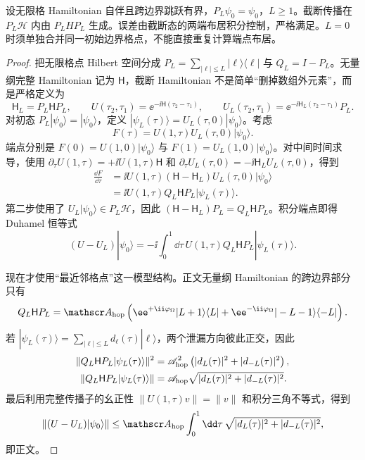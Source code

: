 \begin{proposition}
设无限格 Hamiltonian 自伴且跨边界跳跃有界，$P_L\psi_0=\psi_0$，$L\ge1$。截断传播在 $P_L\mathcal H$ 内由 $P_LHP_L$ 生成。误差由截断态的两端布居积分控制，严格满足。$L=0$ 时须单独合并同一初始边界格点，不能直接重复计算端点布居。
\end{proposition}
\begin{proof}
把无限格点 Hilbert 空间分成
$P_L=\sum_{|\ell|\le L}|\ell\rangle\langle\ell|$ 与 $Q_L=I-P_L$。无量纲完整 Hamiltonian 记为 $\mathsf H$，截断 Hamiltonian 不是简单“删掉数组外元素”，而是严格定义为
\begin{equation*}
 \mathsf H_L=P_L\mathsf H P_L,
 \qquad
 U(\tau_2,\tau_1)=\ee^{-\ii\mathsf H(\tau_2-\tau_1)},
 \qquad
 U_L(\tau_2,\tau_1)=\ee^{-\ii\mathsf H_L(\tau_2-\tau_1)}P_L.
\end{equation*}
对初态 $P_L|\psi_0\rangle=|\psi_0\rangle$，定义
$|\psi_L(\tau)\rangle=U_L(\tau,0)|\psi_0\rangle$。考虑
\begin{equation*}
 F(\tau)=U(1,\tau)U_L(\tau,0)|\psi_0\rangle .
\end{equation*}
端点分别是 $F(0)=U(1,0)|\psi_0\rangle$ 与
$F(1)=U_L(1,0)|\psi_0\rangle$。对中间时间求导，使用
$\partial_\tau U(1,\tau)=+\ii U(1,\tau)\mathsf H$ 和
$\partial_\tau U_L(\tau,0)=-\ii\mathsf H_LU_L(\tau,0)$，得到
\begin{align*}
 \frac{\dd F}{\dd\tau}
 &=\ii U(1,\tau)(\mathsf H-\mathsf H_L)
 U_L(\tau,0)|\psi_0\rangle\\
 &=\ii U(1,\tau)Q_L\mathsf H P_L
 |\psi_L(\tau)\rangle .
\end{align*}
第二步使用了 $U_L|\psi_0\rangle\in P_L\mathcal H$，因此
$(\mathsf H-\mathsf H_L)P_L=Q_L\mathsf H P_L$。积分端点即得 Duhamel 恒等式
\begin{equation*}
 (U-U_L)|\psi_0\rangle
 =-\ii\int_0^1\dd\tau\,
 U(1,\tau)Q_L\mathsf H P_L|\psi_L(\tau)\rangle .
\end{equation*}

现在才使用“最近邻格点”这一模型结构。正文无量纲 Hamiltonian 的跨边界部分只有
\begin{equation*}
 Q_L\mathsf H P_L
 =\mathscr A_{\rm hop}
 \left(
 \ee^{+\ii\varphi_\Omega}|L+1\rangle\langle L|
 +\ee^{-\ii\varphi_\Omega}|-L-1\rangle\langle-L|
 \right).
\end{equation*}
若
$|\psi_L(\tau)\rangle=\sum_{|\ell|\le L}d_\ell(\tau)|\ell\rangle$，两个泄漏方向彼此正交，因此
\begin{align*}
 \|Q_L\mathsf H P_L|\psi_L(\tau)\rangle\|^2
 &=\mathscr A_{\rm hop}^2
 \left(|d_L(\tau)|^2+|d_{-L}(\tau)|^2\right),\\
 \|Q_L\mathsf H P_L|\psi_L(\tau)\rangle\|
 &=\mathscr A_{\rm hop}
 \sqrt{|d_L(\tau)|^2+|d_{-L}(\tau)|^2}.
\end{align*}
最后利用完整传播子的幺正性
$\|U(1,\tau)v\|=\|v\|$ 和积分三角不等式，得到
\begin{equation*}
 \|(U-U_L)|\psi_0\rangle\|
 \le\mathscr A_{\rm hop}\int_0^1\dd\tau\,
 \sqrt{|d_L(\tau)|^2+|d_{-L}(\tau)|^2},
\end{equation*}
即正文。
\end{proof}


